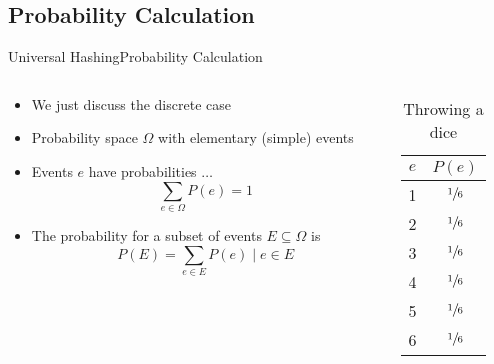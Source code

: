 \subsection{Probability Calculation}
\def\E{\mathbb{E}}
\begin{frame}{Universal Hashing}{Probability Calculation}
  \begin{columns}
    \begin{column}{0.65\textwidth}
      \begin{itemize}
        \item<2->
          We just discuss the discrete case
        \item<3->
          Probability space {\color{MainA}$\Omega$} with {\color{MainA}elementary (simple) events}
        \item<4->
          Events {\color{MainA}$e$} have probabilities $\ldots$\\
          {\color{MainA}\[\sum_{e \in \Omega} P(e) = 1\]}
        \item<5->
          The probability for a subset of events
          {\color{MainA}$E \subseteq \Omega$} is
          {\color{MainA}\[P(E) = \sum_{e \in E} P(e) \mid e \in E\]}
      \end{itemize}
    \end{column}
    \begin{column}{0.35\textwidth}
      \begin{table}[!h]
        \caption{Throwing a dice}
        \label{tab:probabilities:rolling_dice}
        \begin{tabularx}{0.5\linewidth}{c|c}
          {\color{MainA}$e$} & {\color{MainA}$P(e)$}\\
          \midrule
          1 & $\sfrac{1}{6}$\\
          2 & $\sfrac{1}{6}$\\
          3 & $\sfrac{1}{6}$\\
          4 & $\sfrac{1}{6}$\\
          5 & $\sfrac{1}{6}$\\
          6 & $\sfrac{1}{6}$\\
        \end{tabularx}
      \end{table}
    \end{column}
  \end{columns}
\end{frame}


